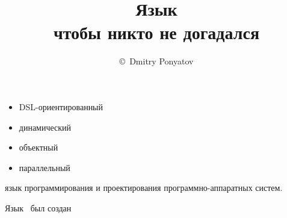 
\title{Язык \bi\\\normalsize{чтобы никто не догадался}}
\author{\copyright\ Dmitry Ponyatov }


\maketitle

\tableofcontents


\begin{itemize}[nosep]
\item DSL-ориентированный
\item динамический
\item объектный
\item параллельный
\end{itemize}

язык программирования и проектирования программно-аппаратных систем.

Язык \bi\ был создан 

%




